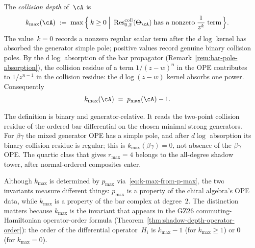 \begin{definition}
\label{def:k-max}
The \emph{collision depth} of~$\cA$ is
\begin{equation}\label{eq:k-max-def}
k_{\max}(\cA)
\;:=\;
\max\Big\{\,k \geq 0
\;\Big|\;
\operatorname{Res}^{\mathrm{coll}}_{0,2}(\Theta_\cA)
\;\text{has a nonzero}\;\frac{1}{z^k}\;\text{term}\,\Big\}.
\end{equation}
The value~$k=0$ records a nonzero regular scalar term after the
$d\log$ kernel has absorbed the generator simple pole; positive
values record genuine binary collision poles.
By the $\mathrm{d}\log$ absorption of the bar propagator
\textup{(}Remark~\textup{\ref{rem:bar-pole-absorption}}\textup{)},
the collision residue of a term $1/(z-w)^n$ in the OPE contributes
to $1/z^{n-1}$ in the collision residue: the $\mathrm{d}\log(z-w)$
kernel absorbs one power. Consequently
\begin{equation}\label{eq:k-max-from-p-max}
k_{\max}(\cA)
\;=\;
p_{\max}(\cA) - 1.
\end{equation}
\end{definition}

\begin{remark}
\label{rem:kmax-regular-term}
The definition is binary and generator-relative. It reads the
two-point collision residue of the ordered bar differential on the
chosen minimal strong generators. For $\beta\gamma$ the mixed
generator OPE has a simple pole, and after $d\log$ absorption its
binary collision residue is regular; this is
$k_{\max}(\beta\gamma)=0$, not absence of the $\beta\gamma$ OPE. The
quartic class that gives $r_{\max}=4$ belongs to the all-degree
shadow tower, after normal-ordered composites enter.
\end{remark}

\begin{remark}
\label{rem:k-max-not-redundant}
Although $k_{\max}$ is determined by $p_{\max}$
via~\eqref{eq:k-max-from-p-max}, the two invariants measure different
things: $p_{\max}$ is a property of the chiral algebra's OPE data,
while $k_{\max}$ is a property of the bar complex at degree~$2$. The
distinction matters because $k_{\max}$ is the invariant that appears
in the GZ\textup{26} commuting-Hamiltonian operator-order formula
\textup{(}Theorem~\textup{\ref{thm:shadow-depth-operator-order}}\textup{)}:
the order of the differential operator~$H_i$ is $k_{\max} - 1$
\textup{(}for $k_{\max}\geq 1$\textup{)} or $0$
\textup{(}for $k_{\max} = 0$\textup{)}.
\end{remark}


